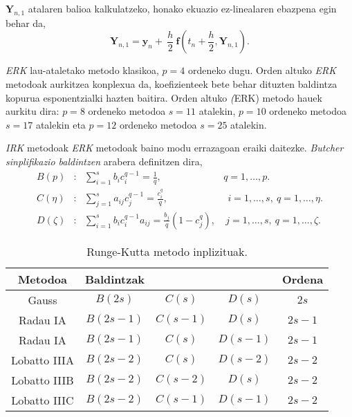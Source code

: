 $\mathbf{Y}_{n,1}$ atalaren balioa kalkulatzeko, honako ekuazio ez-linealaren ebazpena egin behar da,
\begin{equation*}
\mathbf{Y}_{n,1}=\mathbf{y}_n+\ \frac{h}{2} \ \mathbf{f}(t_n+\frac{h}{2},\mathbf{Y}_{n,1}).
\end{equation*} 


\emph{ERK} lau-ataletako  metodo klasikoa, $p=4$ ordeneko dugu. Orden altuko \emph{ERK} metodoak aurkitzea konplexua da,  koefizienteek bete behar dituzten baldintza kopurua esponentzialki hazten baitira. Orden altuko \emph (ERK) metodo hauek aurkitu dira: $p=8$ ordeneko metodoa $s=11$ atalekin, $p=10$ ordeneko metodoa $s=17$ atalekin eta  $p=12$ ordeneko metodoa $s=25$ atalekin. 

\emph{IRK} metodoak \emph{ERK} metodoak baino modu errazagoan eraiki daitezke.  \emph{Butcher sinplifikazio baldintzen} \cite{Butcher2008} arabera definitzen dira,
\begin{align*}
B(p) &: \ \ \ \sum\limits_{i=1}^{s} b_ic_i^{q-1} =\frac{1}{q}, \ \ & q=1,\dots,p. \\
C(\eta) &: \ \ \ \sum\limits_{j=1}^{s} a_{ij}c_j^{q-1}  =\frac{c_i^q}{q},& \ \ i=1,\dots,s, \ q=1,\dots,\eta.\\
D(\zeta) &:  \ \ \ \sum\limits_{i=1}^{s}  b_i c_i^{q-1}  a_{ij} = \frac{b_j}{q} (1-c_j^q),&  \ j=1,\dots,s, \  q=1,\dots,\zeta.
\end{align*}


\begin{table}
\caption{Runge-Kutta metodo inplizituak.}
\label{tab:21}       %
\begin{tabular}{ c c c c c } 
 \hline
 Metodoa          &  Baldintzak             &                        &                 & Ordena \\
 \hline
 Gauss            &  $B(2s)$                & $C(s)$                 & $D(s)$          & $2s$    \\
 \hline
 Radau IA         &  $B(2s-1)$              & $C(s-1)$               & $D(s)$          & $2s-1$  \\
 \hline 
 Radau IA         &  $B(2s-1)$              & $C(s)$                 & $D(s-1)$        & $2s-1$  \\
 \hline 
 Lobatto IIIA     &  $B(2s-2)$              & $C(s)$                 & $D(s-2)$        & $2s-2$  \\
 \hline
 Lobatto IIIB     &  $B(2s-2)$              & $C(s-2)$               & $D(s)$          & $2s-2$  \\
 \hline 
 Lobatto IIIC     &  $B(2s-2)$              & $C(s-1)$               & $D(s-1)$        & $2s-2$  \\
  \hline
 \end{tabular}
\end{table}

